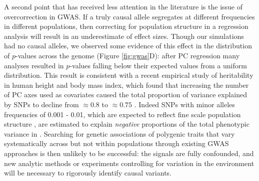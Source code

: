 \documentclass[11pt,twoside,lineno]{preprint}
\newif\ifcomments
\newcommand{\ak}[1]{\ifcomments{{\color{red} \it (#1)}}\else{}\fi}
\begin{document}
A second point that has received less attention in the literature is the issue of overcorrection in GWAS. If a truly causal allele segregates at different frequencies in different populations, then correcting for population structure in a regression analysis will result in an underestimate of effect sizes. Though our simulations had no causal alleles, we observed some evidence of this effect in the distribution of $p$-values across the genome (Figure \ref{fig:gwas}D): after PC regression many analyses resulted in $p$-values falling below their expected values from a uniform distribution. This result is consistent with a recent empirical study of heritability in human height and body mass index, which found that increasing the number of PC axes used as covariates caused the total proportion of variance explained by SNPs to decline from $\approx0.8$ to $\approx0.75$ \citep{Wainschtein2019}. Indeed SNPs with minor alleles frequencies of 0.001 - 0.01, which are expected to reflect fine scale population structure \citep{Mathieson2012,Novembre2009}, are estimated to explain \textit{negative} proportions of the total phenotypic variance in \citep{Wainschtein2019}\ak{i don't understand what the authors mean here-- how can we have a negative variance?}. Searching for genetic associations of polygenic traits that vary systematically across but not within populations through existing GWAS approaches is then unlikely to be successful: the signals are fully confounded, and new analytic methods or experiments controlling for variation in the environment will be necessary to rigorously identify causal variants. 
\end{document}
